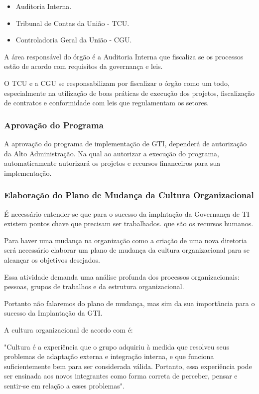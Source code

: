 \begin{itemize}	
\item Auditoria Interna.
\item Tribunal de Contas da União - TCU.
\item Controladoria Geral da União - CGU.
\end{itemize}

A área responsável do órgão é a Auditoria Interna que fiscaliza se os processos estão de acordo com requisitos da governança e leis.

O TCU e a CGU se responsabilizam por fiscalizar o órgão como um todo, especialmente na utilização de boas práticas de execução dos projetos, fiscalização de contratos e conformidade com leis que regulamentam os setores.

\subsubsection{Aprovação do Programa}

A aprovação do programa de implementação de GTI, dependerá de autorização da Alto Administração. Na qual ao autorizar a execução do programa, automaticamente autorizará os projetos e recursos financeiros para sua implementação.

\subsubsection{Elaboração do Plano de Mudança da Cultura Organizacional}\label{sec:cultural} 

É necessário entender-se que para o sucesso da implntação da Governança de TI existem pontos chave que precisam ser trabalhados. que são os recursos humanos.

Para haver uma mudança na organização como a criação de uma nova diretoria será necessário elaborar um plano de mudança da cultura organizacional para se alcançar os objetivos desejados. 

Essa atividade demanda uma análise profunda dos processos organizacionais: pessoas, grupos de trabalhos e da estrutura organizacional.

 Portanto não falaremos do plano de mudança, mas sim da sua importância para o sucesso da Implantação da GTI.

A cultura organizacional de acordo com \cite{schein:1985} é:

"Cultura é a experiência que o grupo adquiriu à medida que resolveu seus problemas de adaptação externa e integração interna, e que funciona suficientemente bem para ser considerada válida. Portanto, essa experiência pode ser ensinada aos novos integrantes como forma correta de perceber, pensar e sentir-se em relação a esses problemas".

